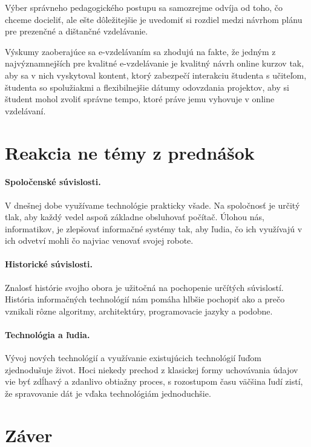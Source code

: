 \documentclass[10pt,slovak,a4paper]{article}
\begin{document}
	Výber správneho pedagogického postupu sa samozrejme odvíja od toho, čo chceme docieliť, ale ešte dôležitejšie je uvedomiť si rozdiel medzi návrhom plánu pre prezenčné a dištančné vzdelávanie.
	\cite{main}

	Výskumy zaoberajúce sa e-vzdelávaním sa zhodujú na fakte, že jedným z najvýznamnejších pre kvalitné e-vzdelávanie je kvalitný návrh online kurzov tak, aby sa v nich vyskytoval kontent, ktorý zabezpečí interakciu študenta s učiteľom, študenta so spolužiakmi a flexibilnejšie dátumy odovzdania projektov, aby si študent mohol zvoliť správne tempo, ktoré práve jemu vyhovuje v online vzdelávaní.
	\cite{main}

\section{Reakcia ne témy z prednášok} \label{reakcia}
	\paragraph{Spoločenské súvislosti.}

	V dnešnej dobe využívame technológie prakticky všade. Na spoločnosť je určitý tlak, aby každý vedel aspoň základne obsluhovať počítač. Úlohou nás, informatikov, je zlepšovať informačné systémy tak, aby ľudia, čo ich využívajú v ich odvetví mohli čo najviac venovať svojej robote. 

	\paragraph{Historické súvislosti.}

	Znalosť histórie svojho obora je užitočná na pochopenie určítých súvislostí. História informačných technológií nám pomáha hlbšie pochopiť ako a prečo vznikali rôzne algoritmy, architektúry, programovacie jazyky a podobne.

	\paragraph{Technológia a ľudia.}

	Vývoj nových technológií a využívanie existujúcich technológií ľuďom zjednodušuje život. Hoci niekedy prechod z klasickej formy uchovávania údajov vie byť zdĺhavý a zdanlivo obtiažny proces, s rozostupom času väčšina ľudí zistí, že spravovanie dát je vďaka technológiám jednoduchšie.



\section{Záver} \label{zaver} 

\end{document}
